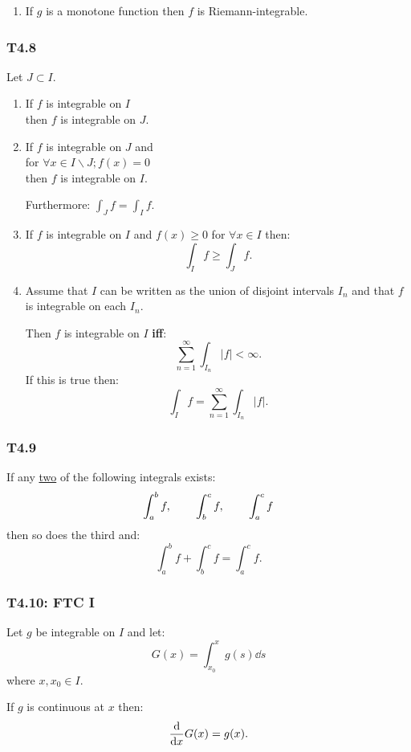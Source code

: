 \documentclass{article}
\begin{document}
\begin{multicols*}{3}
\begin{enumerate}
    \item If $g$ is a monotone function
    then $f$ is Riemann-integrable.
\end{enumerate}

\subsubsection*{T4.8}
Let $J\subset I$.
\begin{enumerate}
    \item If $f$ is integrable on $I$ \\
    then $f$ is integrable on $J$.

    \item If $f$ is integrable on $J$
    and \\ for $\forall x\in I\backslash J; f(x)=0$ \\
    then $f$ is integrable on $I$.

    Furthermore: $\displaystyle\int_J f=\int_I f$.

    \item If $f$ is integrable on $I$ and
    $f(x)\geq0$ for $\forall x\in I$ then:
    $$\int_I f\geq\int_J f.$$

    \item Assume that $I$ can be written as the union
    of disjoint intervals $I_n$ and that
    $f$ is integrable on each $I_n$.

    Then $f$ is integrable on $I$ \textbf{if{}f}:
    $$\sum_{n=1}^{\infty}\int_{I_n}|f|<\infty.$$
    If this is true then:
    $$\int_I f=\sum_{n=1}^{\infty}\int_{I_n}|f|.$$
\end{enumerate}

\subsubsection*{T4.9}
If any \underline{two} of the following integrals exists:
$$\int_{a}^{b}f,\hspace*{0.3in}
\int_{b}^{c}f,\hspace*{0.3in}
\int_{a}^{c}f$$
then so does the third and:
$$\int_{a}^{b}f+\int_{b}^{c}f=\int_{a}^{c}f.$$

\subsubsection*{T4.10: FTC I}
Let $g$ be integrable on $I$ and let:
$$G(x)=\int_{x_0}^{x}g(s)\dd s$$
where $x,x_0\in I$.

If $g$ is continuous at $x$ then:
$$\dv{x}G(x)=g(x).$$


\end{multicols*}
\end{document}
